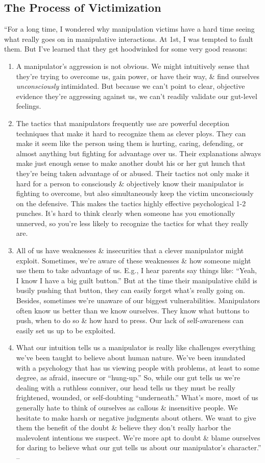 \documentclass{article}
\numberwithin{equation}{section}
\begin{document}
\subsection{The Process of Victimization}
``For a long time, I wondered why manipulation victims have a hard time seeing what really goes on in manipulative interactions. At 1st, I was tempted to fault them. But I've learned that they get hoodwinked for some very good reasons:
\begin{enumerate}
	\item A manipulator's aggression is not obvious. We might intuitively sense that they're trying to overcome us, gain power, or have their way, \& find ourselves \textit{unconsciously} intimidated. But because we can't point to clear, objective evidence they're aggressing against us, we can't readily validate our gut-level feelings.
	\item The tactics that manipulators frequently use are powerful deception techniques that make it hard to recognize them as clever ploys. They can make it seem like the person using them is hurting, caring, defending, or almost anything but fighting for advantage over us. Their explanations always make just enough sense to make another doubt his or her gut hunch that they're being taken advantage of or abused. Their tactics not only make it hard for a person to consciously \& objectively know their manipulator is fighting to overcome, but also simultaneously keep the victim unconsciously on the defensive. This makes the tactics highly effective psychological 1-2 punches. It's hard to think clearly when someone has you emotionally unnerved, so you're less likely to recognize the tactics for what they really are.
	\item All of us have weaknesses \& insecurities that a clever manipulator might exploit. Sometimes, we're aware of these weaknesses \& how someone might use them to take advantage of us. E.g., I hear parents say things like: ``Yeah, I know I have a big guilt button.'' But at the time their manipulative child is busily pushing that button, they can easily forget what's really going on. Besides, sometimes we're unaware of our biggest vulnerabilities. Manipulators often know us better than we know ourselves. They know what buttons to push, when to do so \& how hard to press. Our lack of self-awareness can easily set us up to be exploited.
	\item What our intuition tells us a manipulator is really like challenges everything we've been taught to believe about human nature. We've been inundated with a psychology that has us viewing people with problems, at least to some degree, as afraid, insecure or ``hung-up.'' So, while our gut tells us we're dealing with a ruthless conniver, our head tells us they must be really frightened, wounded, or self-doubting ``underneath.'' What's more, most of us generally hate to think of ourselves as callous \& insensitive people. We hesitate to make harsh or negative judgments about others. We want to give them the benefit of the doubt \& believe they don't really harbor the malevolent intentions we suspect. We're more apt to doubt \& blame ourselves for daring to believe what our gut tells us about our manipulator's character.'' -- \cite[pp. 22--23]{Simon2010}

\end{enumerate}
\end{document}
